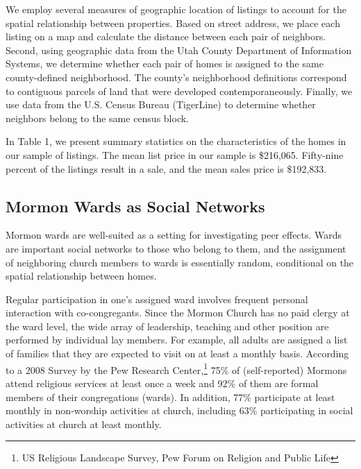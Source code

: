 \documentclass[AEJ,draftmode]{AEA}
\begin{document}
    We employ several measures of geographic location of listings to account for the spatial relationship between properties.  Based on street address, we place each listing on a map and calculate the distance between each pair of neighbors.  Second, using geographic data from the Utah County Department of Information Systems, we determine whether each pair of homes is assigned to the same county-defined neighborhood. The county's neighborhood definitions correspond to contiguous parcels of land that were developed contemporaneously.  Finally, we use data from the U.S. Census Bureau (TigerLine) to determine whether neighbors belong to the same census block.

    In Table 1, we present summary statistics on the characteristics of the homes in our sample of listings. The mean list price in our sample is \$216,065.  Fifty-nine percent of the listings result in a sale, and the mean sales price is \$192,833.

\subsection{Mormon Wards as Social Networks}

    Mormon wards are well-suited as a setting for investigating peer effects. Wards are important social networks to those who belong to them, and the assignment of neighboring church members to wards is essentially random, conditional on the spatial relationship between homes.

    Regular participation in one's assigned ward involves frequent personal interaction with co-congregants. Since the Mormon Church has no paid clergy at the ward level, the wide array of leadership, teaching and other position are performed by individual lay members. For example, all adults are assigned a list of families that they are expected to visit on at least a monthly basis. According to a 2008 Survey by the Pew Research Center,\footnote{US Religious Landscape Survey, Pew Forum on Religion  and Public Life} 75\% of (self-reported) Mormons attend religious services at least once a week and 92\% of them are formal members of their congregations (wards). In addition, 77\% participate at least monthly in non-worship activities at church, including  63\% participating in social activities at church at least monthly.  %
\end{document}

